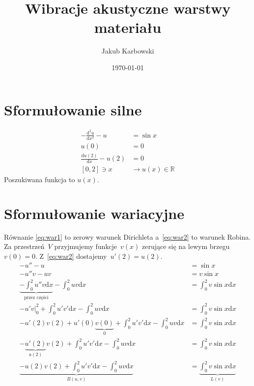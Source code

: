 \documentclass[12pt,a4paper]{mwart}
\begin{document}
\title{Wibracje akustyczne warstwy materiału}
\author{Jakub Karbowski}
\date{\today}
\maketitle


\section{Sformułowanie silne}
\begin{align}
    \label{eq:main}
    -\frac{\mathrm{d}^2u}{\mathrm{d}x^2} - u &= \sin x \\
    \label{eq:war1}
    u(0) &= 0 \\
    \label{eq:war2}
    \frac{\mathrm{d}u(2)}{\mathrm{d}x} - u(2) &= 0 \\
    [0,2] \ni x &\to u(x) \in \mathbb{R} \nonumber
\end{align}
Poszukiwana funkcja to $u(x)$.

\section{Sformułowanie wariacyjne}
Równanie \eqref{eq:war1} to zerowy warunek Dirichleta
a~\eqref{eq:war2} to warunek Robina.
Za przestrzeń~$V$ 
przyjmujemy funkcje~$v(x)$ zerujące się na lewym brzegu
$v(0)=0$.
Z~\eqref{eq:war2} dostajemy~$u'(2)=u(2)$.
\begin{align*}
    -u'' - u &= \sin x \\
    -u''v - uv &= v\sin x \\
    \underbrace{-\int_0^2u''v\mathrm{d}x}_\text{przez części} - \int_0^2uv\mathrm{d}x &= \int_0^2v\sin x\mathrm{d}x \\
    -u'v|_0^2 + \int_0^2u'v'\mathrm{d}x - \int_0^2uv\mathrm{d}x &= \int_0^2v\sin x\mathrm{d}x \\
    -u'(2)v(2) + u'(0)\underbrace{v(0)}_0 + \int_0^2u'v'\mathrm{d}x - \int_0^2uv\mathrm{d}x &= \int_0^2v\sin x\mathrm{d}x \\
    -\underbrace{u'(2)}_{u(2)}v(2) + \int_0^2u'v'\mathrm{d}x - \int_0^2uv\mathrm{d}x &= \int_0^2v\sin x\mathrm{d}x \\
    \underbrace{-u(2)v(2) + \int_0^2u'v'\mathrm{d}x - \int_0^2uv\mathrm{d}x}_{B(u,v)} &= \underbrace{\int_0^2v\sin x\mathrm{d}x}_{L(v)} \\
\end{align*}

\pagebreak
\end{document}
